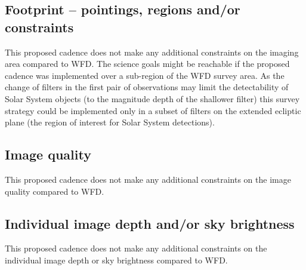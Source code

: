 \documentclass[12pt, letterpaper]{article}
\begin{document}
\subsection{Footprint -- pointings, regions and/or constraints}

\noindent This proposed cadence does not make any additional constraints on the imaging area compared to WFD. The science goals might be reachable if the proposed cadence was implemented over a sub-region of the WFD survey area. As the change of filters in the first pair of observations may limit the detectability of Solar System objects (to the magnitude depth of the shallower filter) this survey strategy could be implemented only in a subset of filters on the extended ecliptic plane (the region of interest for Solar System detections).

\subsection{Image quality}

\noindent This proposed cadence does not make any additional constraints on the image quality compared to WFD. 

\subsection{Individual image depth and/or sky brightness}

\noindent This proposed cadence does not make any additional constraints on the individual image depth or sky brightness compared to WFD. 
\end{document}
